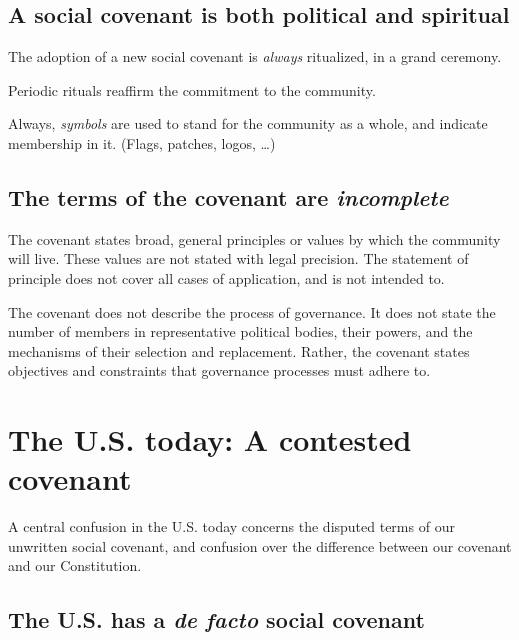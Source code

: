 \documentclass[
]{book}
\begin{document}
\hypertarget{a-social-covenant-is-both-political-and-spiritual}{%
\subsection{A social covenant is both political and spiritual}\label{a-social-covenant-is-both-political-and-spiritual}}

The adoption of a new social covenant is \emph{always} ritualized, in a grand ceremony.

Periodic rituals reaffirm the commitment to the community.

Always, \emph{symbols} are used to stand for the community as a whole, and indicate membership in it. (Flags, patches, logos, \ldots)

\hypertarget{the-terms-of-the-covenant-are-incomplete}{%
\subsection{\texorpdfstring{The terms of the covenant are \emph{incomplete}}{The terms of the covenant are incomplete}}\label{the-terms-of-the-covenant-are-incomplete}}

The covenant states broad, general principles or values by which the community will live. These values are not stated with legal precision. The statement of principle does not cover all cases of application, and is not intended to.

The covenant does not describe the process of governance. It does not state the number of members in representative political bodies, their powers, and the mechanisms of their selection and replacement. Rather, the covenant states objectives and constraints that governance processes must adhere to.

\hypertarget{the-u.s.-today-a-contested-covenant}{%
\section{The U.S. today: A contested covenant}\label{the-u.s.-today-a-contested-covenant}}

A central confusion in the U.S. today concerns the disputed terms of our unwritten social covenant, and confusion over the difference between our covenant and our Constitution.

\hypertarget{the-u.s.-has-a-de-facto-social-covenant}{%
\subsection{\texorpdfstring{The U.S. has a \emph{de facto} social covenant}{The U.S. has a de facto social covenant}}\label{the-u.s.-has-a-de-facto-social-covenant}}
\end{document}
